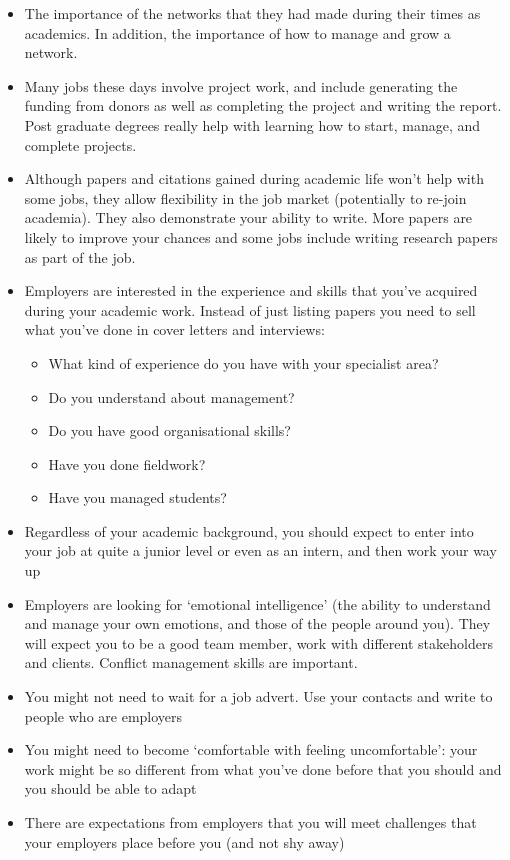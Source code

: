 \documentclass[
]{krantz}
\providecommand{\tightlist}{%
  \setlength{\itemsep}{0pt}\setlength{\parskip}{0pt}}
\begin{document}
\begin{itemize}
\tightlist
\item
  The importance of the networks that they had made during their times as academics. In addition, the importance of how to manage and grow a network.
\item
  Many jobs these days involve project work, and include generating the funding from donors as well as completing the project and writing the report. Post graduate degrees really help with learning how to start, manage, and complete projects.
\item
  Although papers and citations gained during academic life won't help with some jobs, they allow flexibility in the job market (potentially to re-join academia). They also demonstrate your ability to write. More papers are likely to improve your chances and some jobs include writing research papers as part of the job.
\item
  Employers are interested in the experience and skills that you've acquired during your academic work. Instead of just listing papers you need to sell what you've done in cover letters and interviews:

  \begin{itemize}
  \tightlist
  \item
    What kind of experience do you have with your specialist area?
  \item
    Do you understand about management?
  \item
    Do you have good organisational skills?
  \item
    Have you done fieldwork?
  \item
    Have you managed students?
  \end{itemize}
\item
  Regardless of your academic background, you should expect to enter into your job at quite a junior level or even as an intern, and then work your way up
\item
  Employers are looking for `emotional intelligence' (the ability to understand and manage your own emotions, and those of the people around you). They will expect you to be a good team member, work with different stakeholders and clients. Conflict management skills are important.
\item
  You might not need to wait for a job advert. Use your contacts and write to people who are employers
\item
  You might need to become `comfortable with feeling uncomfortable': your work might be so different from what you've done before that you should and you should be able to adapt
\item
  There are expectations from employers that you will meet challenges that your employers place before you (and not shy away)


\end{itemize}
\end{document}
